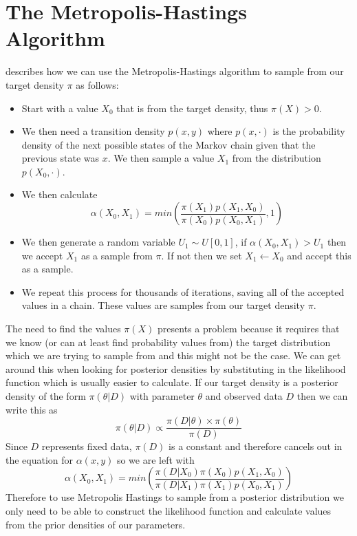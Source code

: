 \documentclass[11pt,a4paper]{report}
\begin{document}
\section{The Metropolis-Hastings Algorithm}
\citet{Voss14} describes how we can use the Metropolis-Hastings algorithm to sample from our target density $\pi$ as follows:
\begin{itemize}
\item Start with a value $X_0$ that is from the target density, thus $\pi(X) > 0$.
\item We then need a transition density $p(x,y)$ where $p(x, \cdot)$ is the probability density of the next possible states of the Markov chain given that the previous state was $x$. We then sample a value $X_1$ from the distribution $p(X_0,\cdot)$.
\item We then calculate 
\[ \alpha(X_0,X_1) = min\left(\frac{\pi(X_1)p(X_1,X_0)}{\pi(X_0)p(X_0,X_1)},1\right) \]
\item We then generate a random variable $U_1 \sim U[0,1]$, if $\alpha(X_0,X_1) > U_1$ then we accept $X_1$ as a sample from $\pi$. If not then we set $X_1 \leftarrow X_0$ and accept this as a sample.
\item We repeat this process for thousands of iterations, saving all of the accepted values in a chain. These values are samples from our target density $\pi$.
\end{itemize}
The need to find the values $\pi(X)$ presents a problem because it requires that we know (or can at least find probability values from) the target distribution which we are trying to sample from and this might not be the case. We can get around this when looking for posterior densities by substituting in the likelihood function which is usually easier to calculate. If our target density is a posterior density of the form $\pi(\theta | D)$ with parameter $\theta$ and observed data $D$ then we can write this as
\[ \pi(\theta | D) \propto \frac{\pi(D | \theta) \times \pi(\theta)}{\pi(D)} \]
Since $D$ represents fixed data, $\pi(D)$ is a constant and therefore cancels out in the equation for $\alpha(x,y)$ so we are left with
\[ \alpha(X_0,X_1) = min\left(\frac{\pi(D | X_0)\pi(X_0)p(X_1,X_0)}{\pi(D | X_1)\pi(X_1)p(X_0,X_1)}\right) \]
Therefore to use Metropolis Hastings to sample from a posterior distribution we only need to be able to construct the likelihood function and calculate values from the prior densities of our parameters.
\end{document}
